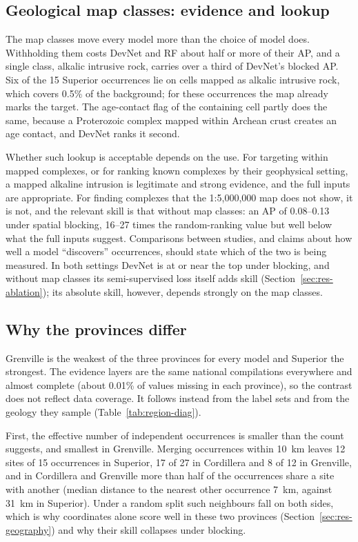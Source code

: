 \documentclass[pdflatex,sn-apa]{sn-jnl}
\begin{document}
\subsection{Geological map classes: evidence and lookup}\label{sec:disc-mapclasses}

The map classes move every model more than the choice of model does. Withholding them costs DevNet and RF about half or more of their AP, and a single class, alkalic intrusive rock, carries over a third of DevNet's blocked AP. Six of the 15 Superior occurrences lie on cells mapped as alkalic intrusive rock, which covers 0.5\% of the background; for these occurrences the map already marks the target. The age-contact flag of the containing cell partly does the same, because a Proterozoic complex mapped within Archean crust creates an age contact, and DevNet ranks it second.

Whether such lookup is acceptable depends on the use. For targeting within mapped complexes, or for ranking known complexes by their geophysical setting, a mapped alkaline intrusion is legitimate and strong evidence, and the full inputs are appropriate. For finding complexes that the 1:5,000,000 map does not show, it is not, and the relevant skill is that without map classes: an AP of 0.08--0.13 under spatial blocking, 16--27 times the random-ranking value but well below what the full inputs suggest. Comparisons between studies, and claims about how well a model ``discovers'' occurrences, should state which of the two is being measured. In both settings DevNet is at or near the top under blocking, and without map classes its semi-supervised loss itself adds skill (Section~\ref{sec:res-ablation}); its absolute skill, however, depends strongly on the map classes.

\subsection{Why the provinces differ}\label{sec:disc-provinces}

Grenville is the weakest of the three provinces for every model and Superior the strongest. The evidence layers are the same national compilations everywhere and almost complete (about 0.01\% of values missing in each province), so the contrast does not reflect data coverage. It follows instead from the label sets and from the geology they sample (Table~\ref{tab:region-diag}).

First, the effective number of independent occurrences is smaller than the count suggests, and smallest in Grenville. Merging occurrences within 10~km leaves 12 sites of 15 occurrences in Superior, 17 of 27 in Cordillera and 8 of 12 in Grenville, and in Cordillera and Grenville more than half of the occurrences share a site with another (median distance to the nearest other occurrence 7~km, against 31~km in Superior). Under a random split such neighbours fall on both sides, which is why coordinates alone score well in these two provinces (Section~\ref{sec:res-geography}) and why their skill collapses under blocking.
\end{document}
